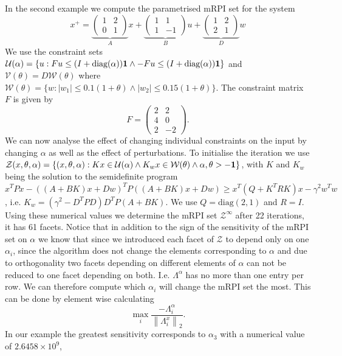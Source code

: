 \documentclass[letterpaper, 10pt, conference]{ieeeconf} %
\providecommand{\norm}[1]{\left\|#1\right\|}
\providecommand{\abs}[1]{\left|#1\right|}
\begin{document}
In the second example we compute the parametrised mRPI set for the system
$$
x^+ = \underbrace{\left(\begin{array}{cc}1 & 2 \\ 0 & 1\end{array}\right)}_Ax + 
\underbrace{\left(\begin{array}{cc} 1 & 1 \\ 1 & -1\end{array}\right)}_B u + 
\underbrace{\left(\begin{array}{cc} 1 & 2 \\ 2 & 1 \end{array}\right)}_D w
$$
We use the constraint sets $\mathcal U(\alpha) = \{u: Fu\leq(I+\text{diag}(\alpha)){\bf{1}} \wedge
-Fu\leq (I+\text{diag}(\alpha)){\bf{1}}\}$ and $\mathcal V(\theta) = D\mathcal W(\theta)$ where $\mathcal W(\theta) = \{w:
\abs{w_1}\leq 0.1(1+\theta)\wedge \abs{w_2}\leq 0.15(1+\theta)\}$. The constraint matrix $F$ is given by
$$
	F = \left(\begin{array}{cc} 2 & 2 \\ 4 & 0 \\ 2 & -2 \end{array}\right).
$$
We can now analyse the effect of changing individual constraints on the input by changing $\alpha$ as well as the
effect of perturbations. To initialise the iteration we use
$\mathcal Z(x,\theta,\alpha) = \left\{(x,\theta,\alpha): Kx\in\mathcal U(\alpha)\wedge K_w x\in\mathcal W
(\theta)\wedge \alpha,\theta>-{\bf{1}}\right\}$, with $K$ and $K_w$ being the solution to the semidefinite program
$x^TPx - ((A+BK)x+Dw)^TP((A+BK)x+Dw)\geq x^T(Q+K^TRK)x -\gamma^2 w^Tw$, i.e. $K_w = (\gamma^2-D^TPD)D^TP(A+BK)$.
We use $Q = \text{diag}(2,1)$ and $R = I$. Using these numerical values we determine the mRPI set 
$\mathcal Z^\infty$ after 22 iterations, it has 61 facets. Notice that in addition to the sign of 
the sensitivity of the mRPI set on $\alpha$ we know that since we introduced each facet of $\mathcal Z$
to depend only on one $\alpha_i$, since the algorithm does not change the elements corresponding to $\alpha$
and due to orthogonality two facets depending on different elements of $\alpha$ can not be reduced to 
one facet depending on both. I.e. $\Lambda^\alpha$ has no more than one entry per row. We can therefore 
compute which $\alpha_i$ will change the mRPI set the most. This can be done by element wise calculating
$$
	\max_i  \frac{-\Lambda_i^\alpha}{\norm{\Lambda_i^x}_2}.
$$
In our example the greatest sensitivity corresponds to $\alpha_3$ with a numerical value of $2.6458\times 10^9$, 
\end{document}
